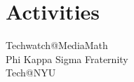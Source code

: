 \documentclass[]{hieudo-build}
\begin{document}
\begin{minipage}[t]{0.34\textwidth}
\section{Activities}
Techwatch@MediaMath \\
Phi Kappa Sigma Fraternity \\
Tech@NYU \\
\sectionsep



\sectionsep
{}

\end{minipage} 
\hfill
\end{document}

